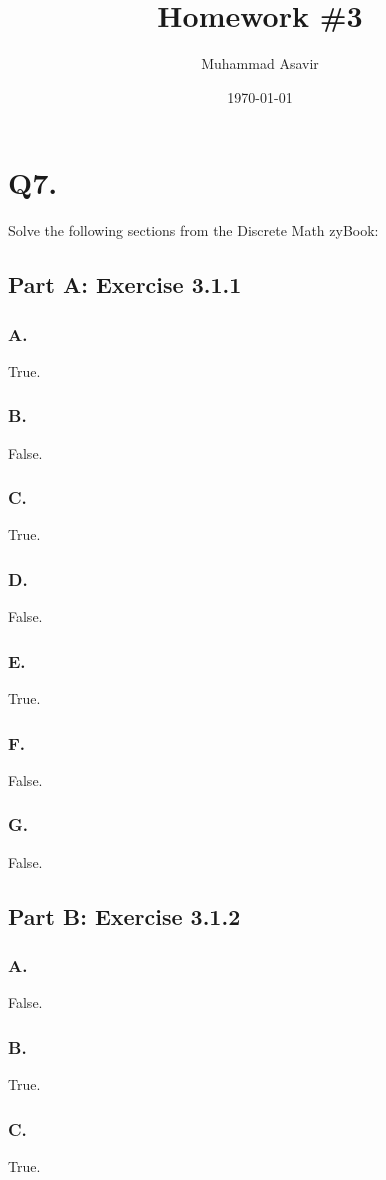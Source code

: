 \documentclass[titlepage]{article}\pagestyle{empty}
\author{Muhammad Asavir}
\title{Homework \#3}
\date{\today}
\begin{document}
\maketitle

\pagebreak
\section*{Q7.} Solve the following sections from the Discrete Math zyBook:
\subsection*{Part A: Exercise 3.1.1} 
\subsubsection*{A.} True.
\subsubsection*{B.} False.
\subsubsection*{C.} True.
\subsubsection*{D.} False.
\subsubsection*{E.} True.
\subsubsection*{F.} False.
\subsubsection*{G.} False.
\subsection*{Part B: Exercise 3.1.2}
\subsubsection*{A.} False.
\subsubsection*{B.} True.
\subsubsection*{C.} True.
\end{document}
